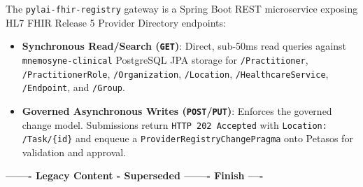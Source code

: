 The \texttt{pylai-fhir-registry} gateway is a Spring Boot REST microservice exposing HL7 FHIR Release 5 Provider Directory endpoints:
\begin{itemize}
    \item \textbf{Synchronous Read/Search (\texttt{GET})}: Direct, sub-50ms read queries against \texttt{mnemosyne-clinical} PostgreSQL JPA storage for \nolinkurl{/Practitioner}, \nolinkurl{/PractitionerRole}, \nolinkurl{/Organization}, \nolinkurl{/Location}, \nolinkurl{/HealthcareService}, \nolinkurl{/Endpoint}, and \nolinkurl{/Group}.
    \item \textbf{Governed Asynchronous Writes (\texttt{POST}/\texttt{PUT})}: Enforces the governed change model. Submissions return \texttt{HTTP 202 Accepted} with \nolinkurl{Location: /Task/{id}} and enqueue a \nolinkurl{ProviderRegistryChangePragma} onto Petasos for validation and approval.
\end{itemize}


\par\noindent\textbf{------- Legacy Content - Superseded ------- Finish ----}

\newpage
